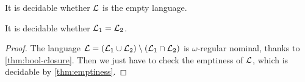 \begin{theorem}
It is decidable whether $\mathcal{L}$ is the empty language.
\label{thm:emptiness}
\end{theorem}

\begin{theorem}
It is decidable whether $\mathcal{L}_1 = \mathcal{L}_2$.
\end{theorem}

\begin{proof}
The language $\mathcal{L} = (\mathcal{L}_1 \cup \mathcal{L}_2) \setminus (\mathcal{L}_1 \cap \mathcal{L}_2 )$ is $\omega$-regular nominal, thanks to \cref{thm:bool-closure}. Then we just have to check the emptiness of $\mathcal{L}$, which is decidable by \cref{thm:emptiness}.
\end{proof}
